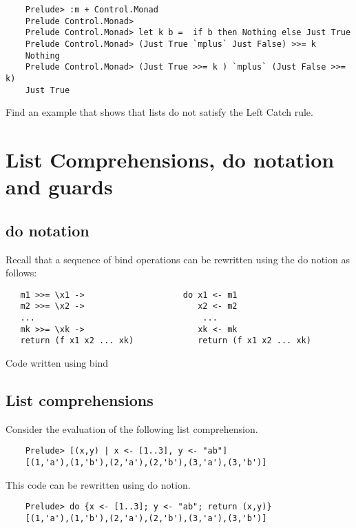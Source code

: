 \documentclass[11pt]{article}
\begin{document}
\begin{verbatim}
    Prelude> :m + Control.Monad
    Prelude Control.Monad> 
    Prelude Control.Monad> let k b =  if b then Nothing else Just True
    Prelude Control.Monad> (Just True `mplus` Just False) >>= k 
    Nothing
    Prelude Control.Monad> (Just True >>= k ) `mplus` (Just False >>=  k)
    Just True
\end{verbatim}

\begin{exercise}
Find an example that shows that lists do not satisfy the Left Catch rule.
\end{exercise}

\section{List Comprehensions, do notation and guards}

\subsection{do notation}

Recall that a sequence of bind operations can be rewritten using the do notion as follows:
\begin{verbatim}
   m1 >>= \x1 ->                    do x1 <- m1		     
   m2 >>= \x2 ->                       x2 <- m2		     
   ...                                  ...		     
   mk >>= \xk ->                       xk <- mk		     
   return (f x1 x2 ... xk)             return (f x1 x2 ... xk)
\end{verbatim}
Code written using bind


\subsection{List comprehensions}
Consider the evaluation of the following list comprehension.
\begin{verbatim}
    Prelude> [(x,y) | x <- [1..3], y <- "ab"]
    [(1,'a'),(1,'b'),(2,'a'),(2,'b'),(3,'a'),(3,'b')]

\end{verbatim}
This code can be rewritten using do notion.

\begin{verbatim}
    Prelude> do {x <- [1..3]; y <- "ab"; return (x,y)}
    [(1,'a'),(1,'b'),(2,'a'),(2,'b'),(3,'a'),(3,'b')]
 
\end{verbatim}
\end{document}
